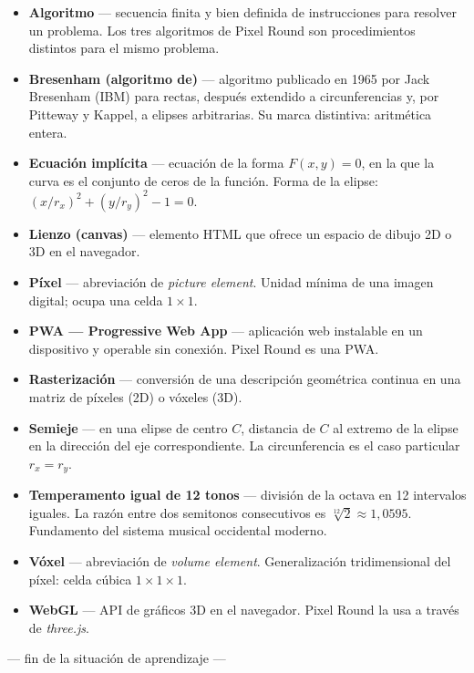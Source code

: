 \documentclass[12pt,a4paper]{scrartcl}
\newcommand{\acc}[1]{\textcolor{accent}{\textbf{#1}}}
\begin{document}
\begin{itemize}[leftmargin=1.4em,itemsep=0.3em,topsep=0.3em]
  \item \acc{Algoritmo} --- secuencia finita y bien definida de instrucciones para resolver un problema. Los tres algoritmos de Pixel Round son procedimientos distintos para el mismo problema.
  \item \acc{Bresenham (algoritmo de)} --- algoritmo publicado en 1965 por Jack Bresenham (IBM) para rectas, después extendido a circunferencias y, por Pitteway y Kappel, a elipses arbitrarias. Su marca distintiva: aritmética entera.
  \item \acc{Ecuación implícita} --- ecuación de la forma $F(x, y) = 0$, en la que la curva es el conjunto de ceros de la función. Forma de la elipse: $(x/r_x)^2 + (y/r_y)^2 - 1 = 0$.
  \item \acc{Lienzo (canvas)} --- elemento HTML que ofrece un espacio de dibujo 2D o 3D en el navegador.
  \item \acc{Píxel} --- abreviación de \emph{picture element}. Unidad mínima de una imagen digital; ocupa una celda $1 \times 1$.
  \item \acc{PWA --- Progressive Web App} --- aplicación web instalable en un dispositivo y operable sin conexión. Pixel Round es una PWA.
  \item \acc{Rasterización} --- conversión de una descripción geométrica continua en una matriz de píxeles (2D) o vóxeles (3D).
  \item \acc{Semieje} --- en una elipse de centro $C$, distancia de $C$ al extremo de la elipse en la dirección del eje correspondiente. La circunferencia es el caso particular $r_x = r_y$.
  \item \acc{Temperamento igual de 12 tonos} --- división de la octava en 12 intervalos iguales. La razón entre dos semitonos consecutivos es $\sqrt[12]{2} \approx 1{,}0595$. Fundamento del sistema musical occidental moderno.
  \item \acc{Vóxel} --- abreviación de \emph{volume element}. Generalización tridimensional del píxel: celda cúbica $1 \times 1 \times 1$.
  \item \acc{WebGL} --- API de gráficos 3D en el navegador. Pixel Round la usa a través de \emph{three.js}.
\end{itemize}

\vspace{2em}
\begin{center}
\color{muted}\small\sffamily
--- fin de la situación de aprendizaje ---
\end{center}
\end{document}
